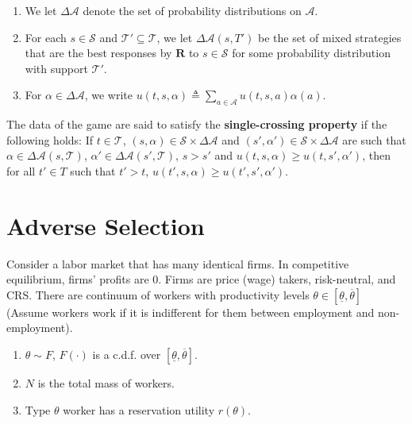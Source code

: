 \documentclass[11pt]{elegantbook}
\begin{document}
\begin{enumerate}
    \item We let $\Delta \mathcal{A}$ denote the set of probability distributions on $\mathcal{A}$.
    \item For each $s\in \mathcal{S}$ and $\mathcal{T}'\subseteq \mathcal{T}$, we let $\Delta\mathcal{A}(s,T')$ be the set of mixed strategies that are the best responses by $\mathbf{R}$ to $s\in \mathcal{S}$ for some probability distribution with support $\mathcal{T}'$.
    \item For $\alpha\in \Delta\mathcal{A}$, we write $u(t,s,\alpha)\triangleq \sum_{a\in \mathcal{A}}u(t,s,a)\alpha(a)$.
\end{enumerate}

\begin{definition}
    \normalfont
    The data of the game are said to satisfy the \textbf{single-crossing property} if the following holds: If $t\in \mathcal{T}$, $(s,\alpha)\in \mathcal{S}\times \Delta\mathcal{A}$ and $(s',\alpha')\in \mathcal{S}\times \Delta\mathcal{A}$ are such that $\alpha\in \Delta\mathcal{A}(s,\mathcal{T})$, $\alpha'\in \Delta\mathcal{A}(s',\mathcal{T})$, $s>s'$ and $u(t,s,\alpha)\geq u(t,s',\alpha')$, then for all $t'\in T$ such that $t'>t$, $u(t',s,\alpha)\geq u(t',s',\alpha')$.
\end{definition}

\section{Adverse Selection}
Consider a labor market that has many identical firms. In competitive equilibrium, firms' profits are $0$. Firms are price (wage) takers, risk-neutral, and CRS. There are continuum of workers with productivity levels $\theta\in\left[\underline{\theta},\overline{\theta}\right]$ (Assume workers work if it is indifferent for them between employment and non-employment).
\begin{enumerate}
    \item $\theta\sim F$, $F(\cdot)$ is a c.d.f. over $\left[\underline{\theta},\overline{\theta}\right]$.
    \item $N$ is the total mass of workers.
    \item Type $\theta$ worker has a reservation utility $r(\theta)$.
\end{enumerate}
\end{document}
